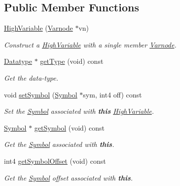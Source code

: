 \subsection*{Public Member Functions}
\begin{DoxyCompactItemize}
\item 
\mbox{\hyperlink{class_high_variable_a227ed3f34ba507b5440e9bfc439c257c}{High\+Variable}} (\mbox{\hyperlink{class_varnode}{Varnode}} $\ast$vn)
\begin{DoxyCompactList}\small\item\em Construct a \mbox{\hyperlink{class_high_variable}{High\+Variable}} with a single member \mbox{\hyperlink{class_varnode}{Varnode}}. \end{DoxyCompactList}\item 
\mbox{\hyperlink{class_datatype}{Datatype}} $\ast$ \mbox{\hyperlink{class_high_variable_ab6b69f8a3f3d5188308cd1ebbf0b0bac}{get\+Type}} (void) const
\begin{DoxyCompactList}\small\item\em Get the data-\/type. \end{DoxyCompactList}\item 
void \mbox{\hyperlink{class_high_variable_abaf12a91905fc7fec1a8283bc9a64e6f}{set\+Symbol}} (\mbox{\hyperlink{class_symbol}{Symbol}} $\ast$sym, int4 off) const
\begin{DoxyCompactList}\small\item\em Set the \mbox{\hyperlink{class_symbol}{Symbol}} associated with {\bfseries{this}} \mbox{\hyperlink{class_high_variable}{High\+Variable}}. \end{DoxyCompactList}\item 
\mbox{\hyperlink{class_symbol}{Symbol}} $\ast$ \mbox{\hyperlink{class_high_variable_abf6ee8ee41bc9ce3b953d70cee28a1e9}{get\+Symbol}} (void) const
\begin{DoxyCompactList}\small\item\em Get the \mbox{\hyperlink{class_symbol}{Symbol}} associated with {\bfseries{this}}. \end{DoxyCompactList}\item 
int4 \mbox{\hyperlink{class_high_variable_ae0fb44bc258cdf238a7c8adc784274b8}{get\+Symbol\+Offset}} (void) const
\begin{DoxyCompactList}\small\item\em Get the \mbox{\hyperlink{class_symbol}{Symbol}} offset associated with {\bfseries{this}}. \end{DoxyCompactList}\item 

\end{DoxyCompactItemize}
